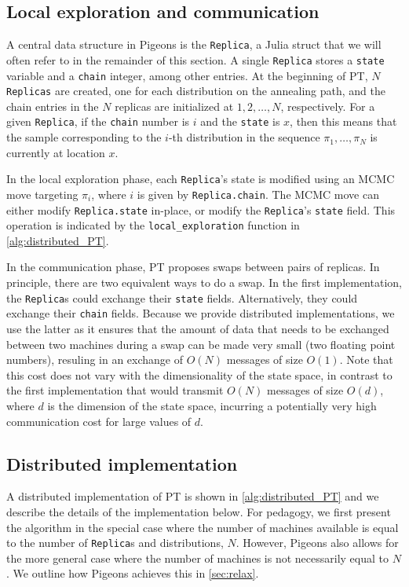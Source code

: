 \subsection{Local exploration and communication}
A central data structure in Pigeons is the \texttt{Replica}, a Julia struct 
that we will often refer to in the remainder of this section. 
A single \texttt{Replica} stores a \texttt{state} variable and a \texttt{chain} 
integer, among other entries. 
At the beginning of PT, $N$ \texttt{Replicas} are created, 
one for each distribution on the annealing path, and 
the chain entries in the $N$ replicas are initialized at $1,2,\ldots,N$, respectively. 
For a given \texttt{Replica}, if the \texttt{chain} number is $i$ and the \texttt{state}
is $x$, then this means that the sample corresponding to the $i$-th distribution in 
the sequence $\pi_1, \ldots, \pi_N$ is currently at location $x$.  

 
In the local exploration phase,
each \texttt{Replica}'s state is modified using an MCMC move targeting $\pi_i$,
where $i$ is given by \texttt{Replica.chain}.
The MCMC move can either modify \texttt{Replica.state} in-place, or modify the 
\texttt{Replica}'s \texttt{state} field. 
This operation is indicated by the \texttt{local\_exploration} function in 
\cref{alg:distributed_PT}.

 
In the communication phase, PT proposes swaps between pairs of replicas. 
In principle, there are two equivalent ways to do a swap.
In the first implementation, the \texttt{Replica}s 
could exchange their \texttt{state} fields.
Alternatively, they could exchange their \texttt{chain} fields.
Because we provide distributed implementations, we use the latter as it ensures that 
the amount of data that needs to be exchanged between two machines during a swap 
can be made very small (two floating point numbers), resuling in 
an exchange of $O(N)$ messages of size $O(1)$. 
Note that this cost does not vary with the dimensionality of the state space, 
in contrast to the first implementation that would transmit 
$O(N)$ messages of size $O(d)$, where $d$ is the dimension of the state space,
incurring a potentially very high communication cost for large values of $d$.


\subsection{Distributed implementation}
A distributed implementation of PT is shown in \cref{alg:distributed_PT}
and we describe the details of the implementation below.
For pedagogy, we first present the algorithm in the special case where the number of machines available 
is equal to the number of \texttt{Replica}s and distributions, $N$. 
However, Pigeons also allows for the more general case where the number of 
machines is not necessarily equal to $N$.
We outline how Pigeons achieves this in \cref{sec:relax}.


